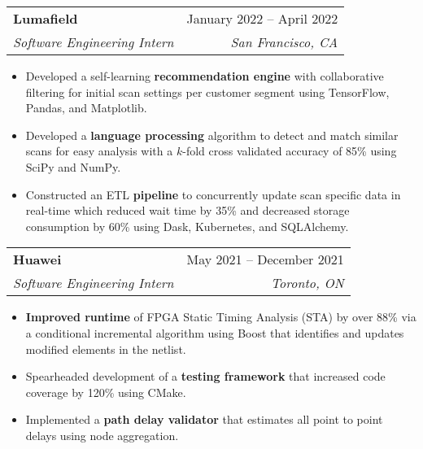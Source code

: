 \documentclass[letterpaper,11pt]{article}
\makeatletter
\renewcommand\small{\normalsize}
\newcommand{\resumeItem}[1]{
  \item\small{
    {#1 \vspace{0pt}}
  }
}
\newcommand{\resumeSubheading}[4]{
  \vspace{-2pt}\item
    \begin{tabular*}{0.97\textwidth}[t]{l@{\extracolsep{\fill}}r}
      \textbf{#1} & #2 \\
      \textit{\small#3} & \textit{\small #4} \\
    \end{tabular*}\vspace{-7pt}
}
\newcommand{\resumeSubSubheading}[2]{
    \item
    \begin{tabular*}{0.97\textwidth}{l@{\extracolsep{\fill}}r}
      \textit{\small#1} & #2 \\
    \end{tabular*}\vspace{-7pt}
}
\newcommand{\resumeSubHeadingListEnd}{\end{itemize}}
\newcommand{\resumeItemListStart}{\begin{itemize}}
\newcommand{\resumeItemListEnd}{\end{itemize}\vspace{-5pt}}
\makeatother
\begin{document}
   \resumeSubheading
      {Lumafield}{January 2022 -- April 2022}
      {Software Engineering Intern}{San Francisco, CA}
       \resumeItemListStart
       \resumeItem{Developed a self-learning \textbf{recommendation engine} with collaborative filtering for initial scan settings per customer segment using TensorFlow, Pandas, and Matplotlib.}
       \resumeItem{Developed a \textbf{language processing} algorithm to detect and match similar scans for easy analysis with a $k$-fold cross validated accuracy of 85\% using SciPy and NumPy.}
       \resumeItem{Constructed an ETL \textbf{pipeline} to concurrently update scan specific data in real-time which reduced wait time by 35\% and decreased storage consumption by 60\% using Dask, Kubernetes, and SQLAlchemy.}
       \resumeItemListEnd
    
    \resumeSubheading
      {Huawei}{May 2021 -- December 2021}
      {Software Engineering Intern}{Toronto, ON}
      \resumeItemListStart
	\resumeItem{\textbf{Improved runtime} of FPGA Static Timing Analysis (STA) by over 88\% via a conditional incremental algorithm using Boost that identifies and updates modified elements in the netlist.}
        \resumeItem{Spearheaded development of a \textbf{testing framework} that increased code coverage by 120\% using CMake.}
	 \resumeItem{Implemented a \textbf{path delay validator} that estimates all point to point delays using node aggregation.}
      \resumeItemListEnd
      \vspace{0pt}
\end{document}
